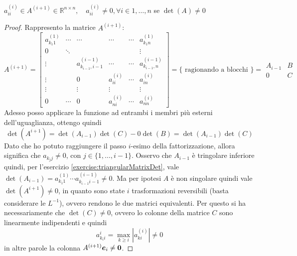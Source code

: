 \begin{exercise}[3.19]
$a^{(i)}_{ii} \in A^{(i+1)} \in \mathbb{R}^{n \times n}, \quad a^{(i)}_{ii} \not
= 0, \forall i \in {1, \ldots, n}$ se $\det(A) \not = 0$
\end{exercise}
\begin{proof}
Rappresento la matrice $A^{(i+1)}$:	
\begin{displaymath}
A^{(i+1)} = \begin{bmatrix}
a_{k_{1} 1}^{(1)} & \cdots & \cdots &\cdots &\cdots & a_{k_{1} n}^{(1)} \\
0 & \ddots &		&	 &	& \vdots\\
\vdots &  		& a_{k_{i-1}, i-1}^{(i-1)} & 	\cdots	& \cdots & a_{k_{i-1},
n}^{(i-1)}\\ 
\vdots & 		&	0	&	a_{ii}^{(i)}	& \cdots & a_{in}^{(i)}\\
\vdots & 		& \vdots		& \vdots & &\vdots\\
0	   & \cdots & 0 	& a_{ni}^{(i)} &\cdots & a_{nn}^{(i)}
\end{bmatrix} = \lbrace \text{ ragionando a blocchi } \rbrace =  
\begin{array}{c|c}
A_{i-1} & B \\
\hline
0		& C
\end{array}
\end{displaymath}
Adesso posso applicare la funzione ad entrambi i membri pi\`u esterni
dell'uguaglianza, ottengo quindi 
\begin{displaymath}
\det(A^{i+1}) = \det(A_{i-1})\det(C) -
0\det(B) = \det(A_{i-1})\det(C)
\end{displaymath}
Dato che ho potuto raggiungere il passo $i$-esimo della fattorizzazione, allora
significa che $a_{k_{j} j} \not = 0$, con $j \in \lbrace 1, \ldots, i-1
\rbrace$. Osservo che $A_{i-1}$ \`e tringolare inferiore quindi, per l'esercizio 
\ref{exercise:triangularMatrixDet}, vale $\det(A_{i-1}) = a_{k_{1}1}^{(1)}
\cdots a_{k_{i-1} i-1}^{(i-1)} \not = 0$. Ma per ipotesi $A$ \`e
non singolare quindi vale $\det(A^{i+1}) \not = 0$, in quanto sono state $i$
trasformazioni reversibili (basta considerare le $L^{-1}$), ovvero rendono le
due matrici equivalenti. Per questo si ha necessariamente che $\det(C) \not =
0$, ovvero lo colonne della matrice $C$ sono linearmente indipendenti e quindi
\begin{displaymath}
a_{k_{i}i}^{i} = \max_{k \geq i}{|a_{ki}^{(i)}|} \not = 0
\end{displaymath}
in altre parole la colonna $A^{(i+1)}\boldsymbol{e}_{i} \not = \boldsymbol{0}$.
\end{proof}

